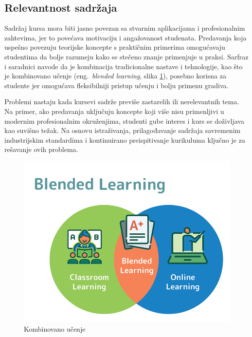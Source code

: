 \documentclass[a4paper]{article}
\begin{document}
\subsection{Relevantnost sadržaja}
Sadržaj kursa mora biti jasno povezan sa stvarnim aplikacijama i profesionalnim zahtevima,
jer to povećava motivaciju i angažovanost studenata. Predavanja koja uspešno povezuju
teorijske koncepte s praktičnim primerima omogućavaju studentima da bolje razumeju kako
se stečeno znanje primenjuje u praksi. Sarfraz i saradnici \cite{sarfraz2022viability} navode da je kombinacija
tradicionalne nastave i tehnologije, kao što je kombinovano učenje (eng.~{\em blended learning}, slika \ref{fig:kombinovano_ucenje}), posebno korisna za studente
jer omogućava fleksibilniji pristup učenju i bolju primenu gradiva.

Problemi nastaju kada kursevi sadrže previše zastarelih ili nerelevantnih tema. Na primer,
ako predavanja uključuju koncepte koji više nisu primenljivi u modernim profesionalnim
okruženjima, studenti gube interes i kurs se doživljava kao suvišno težak. Na osnovu
istraživanja, prilagođavanje sadržaja savremenim industrijskim standardima i kontinuirano
preispitivanje kurikuluma ključno je za rešavanje ovih problema.

\begin{figure}[h!]
\begin{center}
\includegraphics[scale=0.4]{blended_learning.png}
\end{center}
\caption{Kombinovano učenje}
\label{fig:kombinovano_ucenje}
\end{figure}
\end{document}
